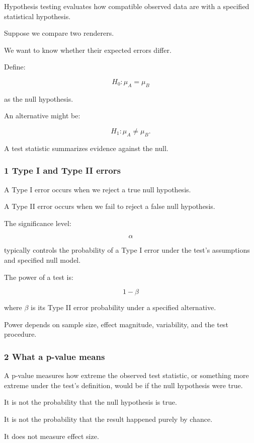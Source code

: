 Hypothesis testing evaluates how compatible observed data are with a specified statistical hypothesis.

Suppose we compare two renderers.

We want to know whether their expected errors differ.

Define:

\[
 H_0:\mu_A=\mu_B
\]

as the null hypothesis.

An alternative might be:

\[
 H_1:\mu_A\ne\mu_B.
\]

A test statistic summarizes evidence against the null.

\subsubsection{1 Type I and Type II errors}\label{02-foundations-ii-ch030-type-i-and-type-ii-errors}

A Type I error occurs when we reject a true null hypothesis.

A Type II error occurs when we fail to reject a false null hypothesis.

The significance level:

\[
 \alpha
\]

typically controls the probability of a Type I error under the test's assumptions and specified null model.

The power of a test is:

\[
 \boxed{ 1-\beta }
\]

where \(\beta\) is its Type II error probability under a specified alternative.

Power depends on sample size, effect magnitude, variability, and the test procedure.

\subsubsection{2 What a p-value means}\label{02-foundations-ii-ch030-what-a-p-value-means}

A p-value measures how extreme the observed test statistic, or something more extreme under the test's definition, would be if the null hypothesis were true.

It is not the probability that the null hypothesis is true.

It is not the probability that the result happened purely by chance.

It does not measure effect size.

